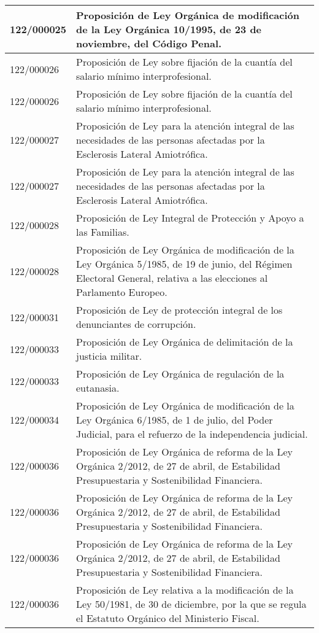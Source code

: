 {\begin{table}[H]
\begin{center}
\begin{tabularx}{\linewidth}{| l | X |}
\hline
122/000025 & Proposición de Ley Orgánica de modificación de la Ley Orgánica 10/1995, de 23 de noviembre, del Código Penal. \\
\hline
122/000026 & Proposición de Ley sobre fijación de la cuantía del salario mínimo interprofesional. \\
\hline
122/000026 & Proposición de Ley sobre fijación de la cuantía del salario mínimo interprofesional. \\
\hline
122/000027 & Proposición de Ley para la atención integral de las necesidades de las personas afectadas por la Esclerosis Lateral Amiotrófica. \\
\hline
122/000027 & Proposición de Ley para la atención integral de las necesidades de las personas afectadas por la Esclerosis Lateral Amiotrófica. \\
\hline
122/000028 & Proposición de Ley Integral de Protección y Apoyo a las Familias. \\
\hline
122/000028 & Proposición de Ley Orgánica de modificación de la Ley Orgánica 5/1985, de 19 de junio, del Régimen Electoral General, relativa a las elecciones al Parlamento Europeo. \\
\hline
122/000031 & Proposición de Ley de protección integral de los denunciantes de corrupción. \\
\hline
122/000033 & Proposición de Ley Orgánica de delimitación de la justicia militar. \\
\hline
122/000033 & Proposición de Ley Orgánica de regulación de la eutanasia. \\
\hline
122/000034 & Proposición de Ley Orgánica de modificación de la Ley Orgánica 6/1985, de 1 de julio, del Poder Judicial, para el refuerzo de la independencia judicial. \\
\hline
122/000036 & Proposición de Ley Orgánica de reforma de la Ley Orgánica 2/2012, de 27 de abril, de Estabilidad Presupuestaria y Sostenibilidad Financiera. \\
\hline
122/000036 & Proposición de Ley Orgánica de reforma de la Ley Orgánica 2/2012, de 27 de abril, de Estabilidad Presupuestaria y Sostenibilidad Financiera. \\
\hline
122/000036 & Proposición de Ley Orgánica de reforma de la Ley Orgánica 2/2012, de 27 de abril, de Estabilidad Presupuestaria y Sostenibilidad Financiera. \\
\hline
122/000036 & Proposición de Ley relativa a la modificación de la Ley 50/1981, de 30 de diciembre, por la que se regula el Estatuto Orgánico del Ministerio Fiscal. \\

\end{tabularx}
\end{center}
\end{table}}
